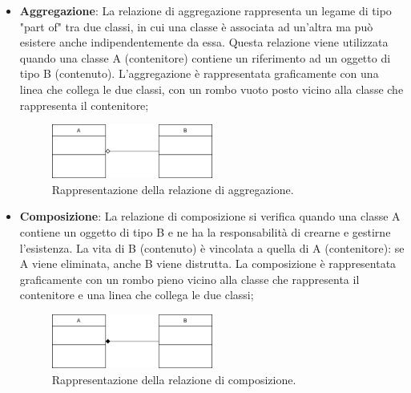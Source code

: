 \documentclass[10pt]{article}
\begin{document}
\begin{justify}
\begin{itemize}
            \item \textbf{Aggregazione}: La relazione di aggregazione rappresenta un legame di tipo "part of" tra due classi, in cui una classe è associata ad un'altra ma può esistere anche indipendentemente da essa. Questa relazione viene utilizzata quando una classe A (contenitore) contiene un riferimento ad un oggetto di tipo B (contenuto). L'aggregazione è rappresentata graficamente con una linea che collega le due classi, con un rombo vuoto posto vicino alla classe che rappresenta il contenitore;
            \begin{figure}[H]
            \centering
            \includegraphics[width=0.5\textwidth]{AggregazioneClasse.png}
            \caption{Rappresentazione della relazione di aggregazione.}
            \end{figure}
        
            \item \textbf{Composizione}: La relazione di composizione si verifica quando una classe A contiene un oggetto di tipo B e ne ha la responsabilità di crearne e gestirne l'esistenza. La vita di B (contenuto) è vincolata a quella di A (contenitore): se A viene eliminata, anche B viene distrutta. La composizione è rappresentata graficamente con un rombo pieno vicino alla classe che rappresenta il contenitore e una linea che collega le due classi;
            \begin{figure}[H]
            \centering
            \includegraphics[width=0.5\textwidth]{ComposizioneClasse.png}
            \caption{Rappresentazione della relazione di composizione.}
            \end{figure}
        

\end{itemize}
\end{justify}
\end{document}
